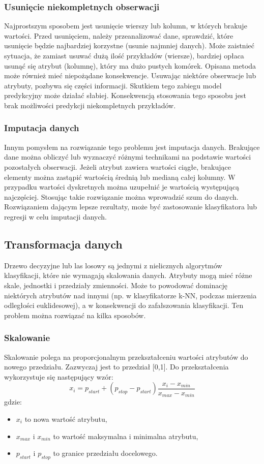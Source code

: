\subsubsection{Usunięcie niekompletnych obserwacji}
Najprostszym sposobem jest usunięcie wierszy lub kolumn, w których brakuje wartości. Przed usunięciem, należy przeanalizować dane, sprawdzić, które usunięcie będzie najbardziej korzystne (usunie najmniej danych). Może zaistnieć sytuacja, że zamiast usuwać dużą ilość przykładów (wiersze), bardziej opłaca usunąć się atrybut (kolumnę), który ma dużo pustych komórek. Opisana metoda może również mieć niepożądane konsekwencje. Usuwając niektóre obserwacje lub atrybuty, pozbywa się części informacji. Skutkiem tego zabiegu model predykcyjny może działać słabiej. Konsekwencją stosowania tego sposobu jest brak możliwości predykcji niekompletnych przykładów.
\subsubsection{Imputacja danych}
Innym pomysłem na rozwiązanie tego problemu jest imputacja danych. Brakujące dane można obliczyć lub wyznaczyć różnymi technikami na podstawie wartości pozostałych obserwacji. Jeżeli atrybut zawiera wartości ciągłe, brakujące elementy można zastąpić wartością średnią lub medianą całej kolumny. W przypadku wartości dyskretnych można uzupełnić je wartością występującą najczęściej. Stosując takie rozwiązanie można wprowadzić szum do danych. Rozwiązaniem dającym lepsze rezultaty, może być zastosowanie klasyfikatora lub regresji w celu imputacji danych.
\subsection{Transformacja danych}
Drzewo decyzyjne lub las losowy są jednymi z nielicznych algorytmów klasyfikacji, które nie wymagają skalowania danych. Atrybuty mogą mieć różne skale, jednostki i przedziały zmienności. Może to powodować dominację niektórych atrybutów nad innymi (np. w klasyfikatorze k-NN, podczas mierzenia odległości euklidesowej), a w konsekwencji do zafałszowania klasyfikacji. Ten problem można rozwiązać na kilka sposobów.
\subsubsection{Skalowanie}
Skalowanie polega na proporcjonalnym przekształceniu wartości atrybutów do nowego przedziału. Zazwyczaj jest to przedział [0,1]. Do przekształcenia wykorzystuje się następujący wzór:
\[x_i=p_{start}+(p_{stop}-p_{start})\frac{x_i-x_{min}}{x_{max}-x_{min}}\]
gdzie:
\begin{itemize}
	\item $x_i$ to nowa wartość atrybutu,
	\item $x_{max}$ i $x_{min}$ to wartość maksymalna i minimalna atrybutu,
	\item $p_{start}$ i $p_{stop}$ to granice przedziału docelowego.
\end{itemize}
